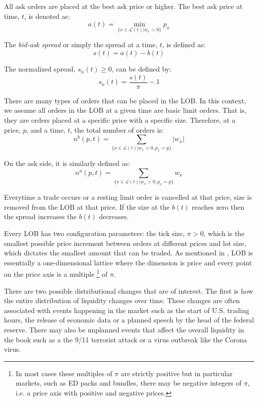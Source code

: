 All ask orders are placed at the best ask price or higher. The best ask price at time, $t$, is denoted as:
\begin{equation}
a(t) = \min_{\{x \in \mathcal{L}(t)|w_x>0 \}} p_x
\end{equation}

The \textit{bid-ask spread} or simply the spread at a time, $t$, is defined as:
\begin{equation}
s(t) = a(t) - b(t)
\end{equation}

The normalized spread, $s_n(t) \geq 0$, can be defined by: 
\begin{equation}
s_n(t) = \frac{s(t)}{\pi} - 1
\end{equation}

There are many types of orders that can be placed in the LOB. In this context, we assume all orders in the LOB at a given time are basic limit orders. That is, they are orders placed at a specific price with a specific size. Therefore, at a price, $p$, and a time, $t$, the total number of orders is:
\begin{equation}
n^b(p, t) = \sum_{\{x \in \mathcal{L}(t)|w_x<0 , p_x=p\}} |w_x|
\end{equation}

On the ask side, it is similarly defined as:
\begin{equation}
n^a(p, t) = \sum_{\{x \in \mathcal{L}(t)|w_x>0 , p_x=p\}}  w_x
\end{equation}

Everytime a trade occurs or a resting limit order is cancelled at that price, size is removed from the LOB at that price. If the size at the $b(t)$ reaches zero then the spread increases the $b(t)$ decreases. 


Every LOB has two configuration parameters: the tick size, $\pi >0$, which is the smallest possible price increment between orders at different prices and lot size, which dictates the smallest amount that can be traded. As mentioned in \cite{gould2016queue}, LOB is essentially a one-dimensional lattice where the dimension is price and every point on the price axis is a multiple \footnote{In most cases these multiples of $\pi$ are strictly positive but in particular markets, such as ED packs and bundles, there may be negative integers of $\pi$, i.e. a price axis with positive and negative prices.} of $\pi$.

There are two possible distributional changes that are of interest. The first is how the entire distribution of liquidity changes over time. These changes are often associated with events happening in the market such as the start of U.S. trading hours, the release of economic data or a planned speech by the head of the federal reserve. There may also be unplanned events that affect the overall liquidity in the book such as a the 9/11 terrorist attack or a virus outbreak like the Corona virus.

